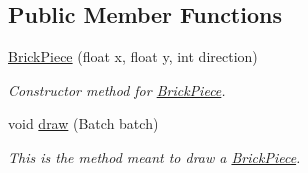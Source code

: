 \subsection*{Public Member Functions}
\begin{DoxyCompactItemize}
\item 
\hyperlink{classnl_1_1arjanfrans_1_1mario_1_1model_1_1brick_1_1BrickPiece_adb0ed3d619092f6f60661039261e6c2d}{Brick\+Piece} (float x, float y, int direction)
\begin{DoxyCompactList}\small\item\em Constructor method for \hyperlink{classnl_1_1arjanfrans_1_1mario_1_1model_1_1brick_1_1BrickPiece}{Brick\+Piece}. \end{DoxyCompactList}\item 
void \hyperlink{classnl_1_1arjanfrans_1_1mario_1_1model_1_1brick_1_1BrickPiece_ae299436fa0ff756fb83e3322afd545c6}{draw} (Batch batch)
\begin{DoxyCompactList}\small\item\em This is the method meant to draw a \hyperlink{classnl_1_1arjanfrans_1_1mario_1_1model_1_1brick_1_1BrickPiece}{Brick\+Piece}. \end{DoxyCompactList}\end{DoxyCompactItemize}
